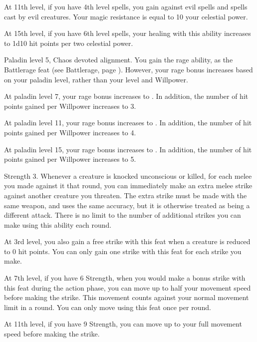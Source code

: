     At 11th level, if you have 4th level spells, you gain  against evil spells and spells cast by evil creatures.
    Your magic resistance is equal to 10 \add your celestial power.

    At 15th level, if you have 6th level spells, your healing with this ability increases to 1d10 hit points per two celestial power.

    \featpres Paladin level 5, Chaos devoted alignment.
    \featben You gain the rage ability, as the Battlerage feat (see Battlerage, page ).
    However, your rage bonus increases based on your paladin level, rather than your level and Willpower.

    At paladin level 7, your rage bonus increases to .
    In addition, the number of hit points gained per Willpower increases to 3.

    At paladin level 11, your rage bonus increases to .
    In addition, the number of hit points gained per Willpower increases to 4.

    At paladin level 15, your rage bonus increases to .
    In addition, the number of hit points gained per Willpower increases to 5.

    \featpre Strength 3.
    \featben Whenever a creature is knocked unconscious or killed, for each melee  you made against it that round, you can immediately make an extra melee strike against another creature you threaten.
    The extra strike must be made with the same weapon, and uses the same accuracy, but it is otherwise treated as being a different attack.
    There is no limit to the number of additional strikes you can make using this ability each round.

    At 3rd level, you also gain a free strike with this feat when a creature is reduced to 0 hit points.
    You can only gain one strike with this feat for each strike you make.

    At 7th level, if you have 6 Strength, when you would make a bonus strike with this feat during the action phase, you can move up to half your movement speed before making the strike.
    This movement counts against your normal movement limit in a round.
    You can only move using this feat once per round.

    At 11th level, if you have 9 Strength, you can move up to your full movement speed before making the strike.

